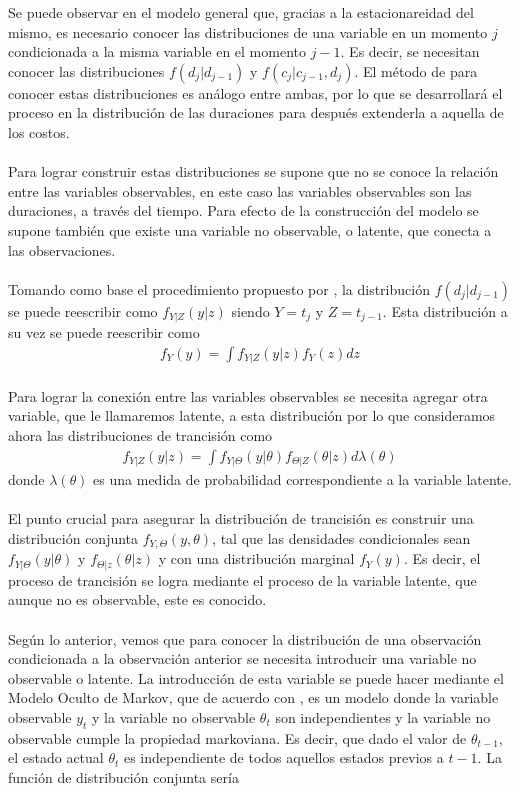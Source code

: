 Se puede observar en el modelo general que, gracias a la estacionareidad del mismo, es necesario conocer las distribuciones de una variable en un momento $j$ condicionada a la misma variable en el momento $j-1$. Es decir, se necesitan conocer las distribuciones $f(d_j|d_{j-1})$ y $f(c_j|c_{j-1},d_j)$. El m\'etodo de para conocer estas distribuciones es an\'alogo entre ambas, por lo que se desarrollar\'a el proceso en la distribuci\'on de las duraciones para despu\'es extenderla a aquella de los costos.\\
\\
Para lograr construir estas distribuciones se supone que no se conoce la relaci\'on entre las variables observables, en este caso las variables observables son las duraciones, a trav\'es del tiempo. Para efecto de la construcci\'on del modelo se supone tambi\'en que existe una variable no observable, o latente, que conecta a las observaciones.\\
\\
Tomando como base el procedimiento propuesto por \cite{pitt2002constructing}, la distribuci\'on $f(d_j|d_{j-1})$ se puede reescribir como $f_{Y|Z}(y|z)$ siendo $Y=t_j$ y $Z=t_{j-1}$. Esta distribuci\'on a su vez se puede reescribir como
\begin{align*}
f_Y(y)=\int f_{Y|Z}(y|z)f_Y(z)dz
\end{align*}
\\
Para lograr la conexi\'on entre las variables observables se necesita agregar otra variable, que le llamaremos latente, a esta distribuci\'on por lo que consideramos ahora las distribuciones de trancisi\'on como
\begin{align*}
f_{Y|Z}(y|z)=\int f_{Y|\Theta}(y|\theta)f_{\Theta|Z}(\theta|z)d\lambda(\theta)
\end{align*}
donde $\lambda(\theta)$ es una medida de probabilidad correspondiente a la variable latente.\\
\\
El punto crucial para asegurar la distribuci\'on de trancisi\'on es construir una distribuci\'on conjunta $f_{Y,\Theta}(y,\theta)$, tal que las densidades condicionales sean $f_{Y|\Theta}(y|\theta)$ y $f_{\Theta|z}(\theta|z)$ y con una distribuci\'on marginal $f_Y(y)$. Es decir, el proceso de trancisi\'on se logra mediante el proceso de la variable latente, que aunque no es observable, este es conocido.\\
\\
Seg\'un lo anterior, vemos que para conocer la distribuci\'on de una observaci\'on condicionada a la observaci\'on anterior se necesita introducir una variable no observable o latente. La introducci\'on de esta variable se puede hacer mediante el Modelo Oculto de Markov, que de acuerdo con \cite{ghahramani2001introduction}, es un modelo donde la variable observable $y_t$ y la variable no observable $\theta_t$ son independientes y la variable no observable cumple la propiedad markoviana. Es decir, que dado el valor de $\theta_{t-1}$, el estado actual $\theta_t$ es independiente de todos aquellos estados previos a $t-1$. La funci\'on de distribuci\'on conjunta ser\'ia
